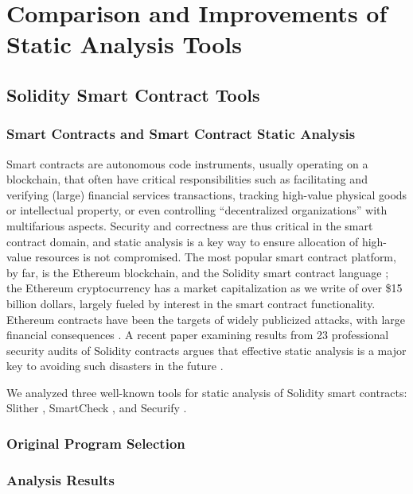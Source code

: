 \section{Comparison and Improvements of Static Analysis Tools}

\subsection{Solidity Smart Contract Tools}

\subsubsection{Smart Contracts and Smart Contract Static Analysis}

Smart contracts are autonomous code instruments, usually operating on a blockchain, that often have critical responsibilities such as facilitating and verifying (large) financial services transactions, tracking high-value physical goods or intellectual property, or even controlling ``decentralized organizations'' with multifarious aspects.  Security and correctness are thus critical in the smart contract domain, and static analysis is a key way to ensure allocation of high-value resources is not compromised.  The most popular smart contract platform, by far, is the Ethereum blockchain, and the Solidity smart contract language \cite{buterin2013whitepaper,wood2014yellow}; the Ethereum cryptocurrency has a market capitalization as we write of over \$15 billion dollars, largely fueled by interest in the smart contract functionality.  Ethereum contracts have been the targets of widely publicized attacks, with large financial consequences  \cite{spank,DAO}.   A recent paper examining results from 23 professional security audits of Solidity contracts argues that effective static analysis is a major key to avoiding such disasters in the future \cite{FC20}.

We analyzed three well-known tools for static analysis of Solidity smart contracts: Slither \cite{slither}, SmartCheck \cite{smartcheck}, and Securify \cite{Securify}.

\subsubsection{Original Program Selection}

\subsubsection{Analysis Results}

